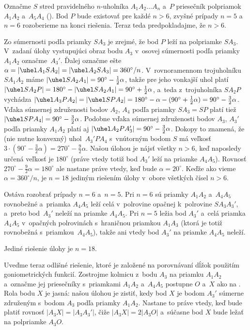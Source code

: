 {%
Označme $S$ stred pravidelného $n$-uholníka $A_1A_2\dots A_n$
a~$P$ priesečník polpriamok $A_1A_2$ a~$A_5A_4$ (\obr). Bod $P$
bude existovať pre každé $n>6$, zvyšné prípady $n=5$ a~$n=6$
rozoberieme na konci riešenia. Teraz teda predpokladajme, že $n>6$.
%

Zo súmernosti podľa priamky $SA_3$ je zrejmé, že
bod $P$ leží na polpriamke $SA_3$. V~zadaní úlohy vystupujúci
obraz bodu $A_3$ v~osovej súmernosti podľa priamky $A_1A_2$
označme~$A_3'$. Ďalej označme ešte
$\alpha=|\uhel A_1SA_2|=|\uhel A_2SA_3|=360^{\circ}/n$.
V~rovnoramennom trojuholníku $SA_1A_2$ máme $|\uhel SA_2A_1|=90^{\circ}-\frac12\alpha$, takže
pre jeho vonkajší uhol platí
$|\uhel SA_2P|={180^{\circ}-|\uhel SA_2A_1|}=90^{\circ}+\frac12\alpha$,
a~teda z~trojuholníka $SA_2P$ vychádza
$|\uhel A_3PA_2|=|\uhel SPA_2|=180^{\circ}-\alpha-(90^{\circ}+\frac12\alpha)=
90^{\circ}-\frac32\alpha$.
Vďaka súmernej združenosti bodov $A_2$, $A_4$ podľa priamky $SA_3=SP$
platí tiež $|\uhel SPA_4|=90^{\circ}-\frac32\alpha$. Podobne vďaka
súmernej združenosti bodov $A_3$, $A_3'$ podľa priamky $A_1A_2$
platí aj $|\uhel A_2PA'_3|=90^{\circ}-\frac32\alpha$.
Dokopy to znamená, že (nie nutne konvexný) uhol~$A_3'PA_4$
s~vnútorným bodom $S$ má veľkosť
$3\cdot(90^{\circ}-\frac32\alpha)=270^{\circ}-\frac92\alpha$. Našou úlohou je
nájsť všetky $n>6$, keď naposledy určená veľkosť je
$180^{\circ}$ (práve vtedy totiž bod $A_3'$ leží na priamke $A_4A_5$).
Rovnosť $270^{\circ}-\frac92\alpha=180^{\circ}$ ale nastane práve vtedy,
keď bude $\alpha=20^{\circ}$. Keďže ako vieme $\alpha=360^{\circ}/n$,
je $n=18$ jediným riešením úlohy v~obore všetkých čísel $n>6$.

Ostáva rozobrať prípady $n=6$ a~$n=5$. Pri $n=6$ sú priamky
$A_1A_2$ a~$A_4A_5$ rovnobežné a~priamka $A_4A_5$ leží celá
v~polrovine opačnej k~polrovine $SA_3A_3'$, a~preto bod~$A_3'$
neleží na priamke $A_4A_5$. Pri $n=5$ ležia bod $A_3'$
a~celá priamka $A_4A_5$ v~opačných polrovinách s~hraničnou priamkou
$A_1A_3$ (ktorá je totiž rovnobežná s~priamkou~$A_4A_5$), takže
ani vtedy bod $A_3'$ na priamke $A_4A_5$ neleží.

\zaver
Jediné riešenie úlohy je $n=18$.

\ineriesenie
Uveďme teraz odlišné riešenie, ktoré je založené na
porovnávaní dĺžok použitím goniometrických funkcií.
Zostrojme kolmicu z~bodu $A_3$ na priamku $A_1A_2$ a~označme jej
priesečníky s~priamkami $A_1A_2$ a~$A_4A_5$ postupne $O$ a~$X$ ako na
\obr{}. Rola bodu $X$ je jasná: našou úlohou je zistiť,
kedy bod $X$ je bodom $A_3'$ súmerne združeným s~bodom $A_3$
podľa priamky $A_1A_2$. Nastane to práve vtedy, keď bude platiť rovnosť
$|A_3X|=|A_3A_3'|$, čiže $|A_3X|=2|A_3O|$
a~súčasne bod $X$ bude ležať na polpriamke $A_3O$.

}
